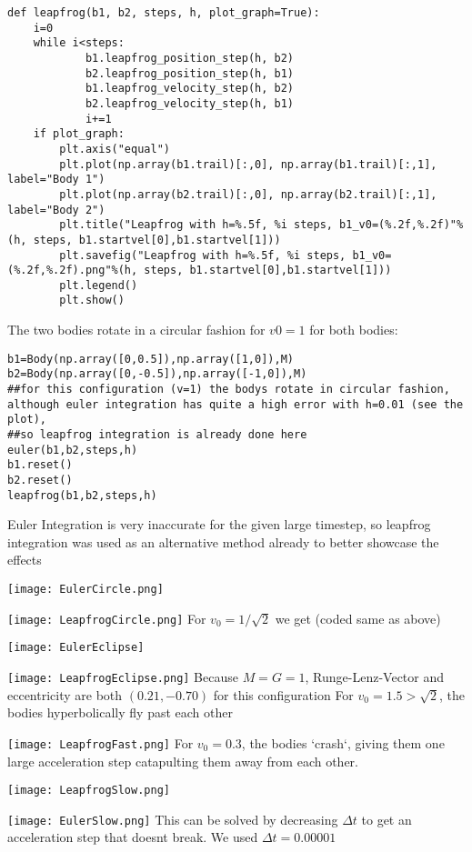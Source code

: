 \documentclass[12pt,a4paper,twoside]{article}
\begin{document}
\begin{lstlisting}
def leapfrog(b1, b2, steps, h, plot_graph=True):
    i=0
    while i<steps:
            b1.leapfrog_position_step(h, b2)
            b2.leapfrog_position_step(h, b1)
            b1.leapfrog_velocity_step(h, b2)
            b2.leapfrog_velocity_step(h, b1)
            i+=1
    if plot_graph:
        plt.axis("equal")
        plt.plot(np.array(b1.trail)[:,0], np.array(b1.trail)[:,1], label="Body 1")
        plt.plot(np.array(b2.trail)[:,0], np.array(b2.trail)[:,1], label="Body 2")
        plt.title("Leapfrog with h=%.5f, %i steps, b1_v0=(%.2f,%.2f)"%(h, steps, b1.startvel[0],b1.startvel[1]))
        plt.savefig("Leapfrog with h=%.5f, %i steps, b1_v0=(%.2f,%.2f).png"%(h, steps, b1.startvel[0],b1.startvel[1]))        
        plt.legend()
        plt.show()
\end{lstlisting} 

The two bodies rotate in a circular fashion for $v0=1$ for both bodies:

\begin{lstlisting}
b1=Body(np.array([0,0.5]),np.array([1,0]),M)
b2=Body(np.array([0,-0.5]),np.array([-1,0]),M)
##for this configuration (v=1) the bodys rotate in circular fashion, although euler integration has quite a high error with h=0.01 (see the plot),
##so leapfrog integration is already done here
euler(b1,b2,steps,h)
b1.reset()
b2.reset()
leapfrog(b1,b2,steps,h)
\end{lstlisting}

Euler Integration is very inaccurate for the given large timestep, so leapfrog integration was used as an alternative method already to better showcase the effects

\texttt{[image: EulerCircle.png]}

\texttt{[image: LeapfrogCircle.png]}
\newpage
For $v_0=1/\sqrt{2}$ we get (coded same as above)

\texttt{[image: EulerEclipse]}

\texttt{[image: LeapfrogEclipse.png]}
Because $M=G=1$, Runge-Lenz-Vector and eccentricity are both $(0.21, -0.70)$ for this configuration
\newpage
For $v_0=1.5>\sqrt{2}$, the bodies hyperbolically fly past each other

\texttt{[image: LeapfrogFast.png]}
\newpage
For $v_0=0.3$, the bodies `crash`, giving them one large acceleration step catapulting them away from each other.

\texttt{[image: LeapfrogSlow.png]}

\texttt{[image: EulerSlow.png]}
\newpage
This can be solved by decreasing $\Delta t$ to get an acceleration step that doesnt break. We used $\Delta t=0.00001$
\end{document}
